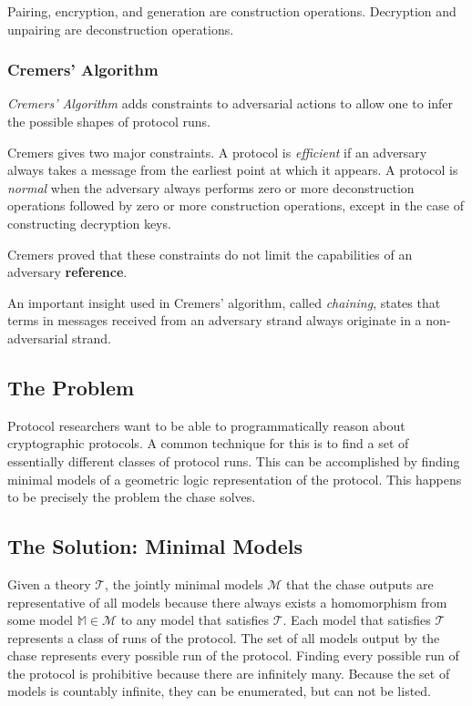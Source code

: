 			Pairing, encryption, and generation are construction operations.
			Decryption and unpairing are deconstruction operations.

		\subsubsection{Cremers' Algorithm}

			\emph{Cremers' Algorithm} adds constraints to adversarial actions
			to allow one to infer the possible shapes of protocol runs.

			Cremers gives two major constraints. A protocol is \emph{efficient}
			if an adversary always takes a message from the earliest point at
			which it appears. A protocol is \emph{normal} when the adversary
			always performs zero or more deconstruction operations followed by
			zero or more construction operations, except in the case of
			constructing decryption keys.

			Cremers proved that these constraints do not limit the capabilities
			of an adversary \textbf{reference}.

			An important insight used in Cremers' algorithm, called
			\emph{chaining}, states that terms in messages received from an
			adversary strand always originate in a non-adversarial strand.

	\subsection{The Problem}

		Protocol researchers want to be able to programmatically reason about
		cryptographic protocols. A common technique for this is to find a set of
		essentially different classes of protocol runs. This can be accomplished by
		finding minimal models of a geometric logic representation of the protocol.
		This happens to be precisely the problem the chase solves.

	\subsection{The Solution: Minimal Models}

		Given a theory $\mathcal{T}$, the jointly minimal models $\mathcal{M}$
		that the chase outputs are representative of all models because there
		always exists a homomorphism from some model $\mathbb{M} \in
		\mathcal{M}$ to any model that satisfies $\mathcal{T}$. Each model that
		satisfies $\mathcal{T}$ represents a class of runs of the protocol. The
		set of all models output by the chase represents every possible run of
		the protocol. Finding every possible run of the protocol is prohibitive
		because there are infinitely many. Because the set of models is
		countably infinite, they can be enumerated, but can not be listed.

